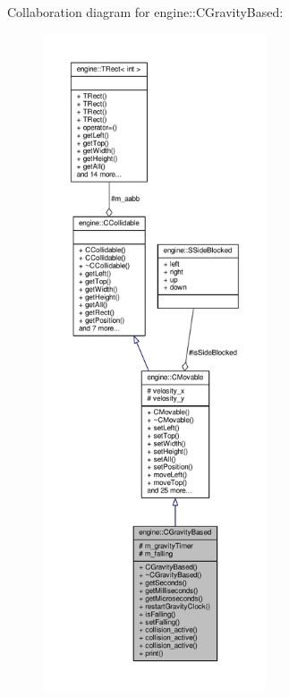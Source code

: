 Collaboration diagram for engine\-:\-:C\-Gravity\-Based\-:\nopagebreak
\begin{figure}[H]
\begin{center}
\leavevmode
\includegraphics[height=550pt]{classengine_1_1CGravityBased__coll__graph}
\end{center}
\end{figure}
